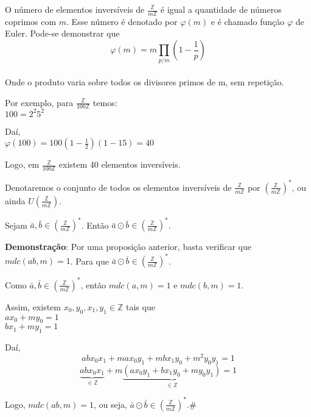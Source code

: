 O número de elementos inversíveis de $\displaystyle\frac{\mathbb{Z}}{m\mathbb{Z}}$ é igual a quantidade de números coprimos com $m$. Esse número é denotado por $\varphi(m)$ e é chamado função $\varphi$ de Euler. Pode-se demonstrar que
\[\varphi(m)=m\displaystyle\prod_{p/m}\left(1-\displaystyle\frac{1}{p}\right)\]\\
Onde o produto varia sobre todos os divisores primos de m, sem repetição.

Por exemplo, para $\displaystyle\frac{\mathbb{Z}}{100\mathbb{Z}}$ temos:\\
$100=2^{2}5^{2}$

Daí,\\
$\varphi(100)=100\left(1-\displaystyle\frac{1}{2}\right)(1-\displaystyle{1}{5})=40$

Logo, em $\displaystyle\frac{\mathbb{Z}}{100\mathbb{Z}}$ existem 40 elementos inversíveis.

\begin{nota} Denotaremos o conjunto de todos os elementos inversíveis de $\displaystyle\frac{\mathbb{Z}}{m\mathbb{Z}}$ por $\left(\displaystyle\frac{\mathbb{Z}}{m\mathbb{Z}}\right)^{*}$, ou ainda $U\left(\displaystyle\frac{\mathbb{Z}}{m\mathbb{Z}}\right)$.\end{nota}

\begin{proposicao} Sejam $\bar{a},\bar{b}\in\left(\displaystyle\frac{\mathbb{Z}}{m\mathbb{Z}}\right)^{*}$. Então $\bar{a}\odot\bar{b}\in\left(\displaystyle\frac{\mathbb{Z}}{m\mathbb{Z}}\right)^{*}$.\end{proposicao}

\textbf{Demonstração}: Por uma proposição anterior, basta verificar que\\ $mdc(ab,m)=1$. Para que $\bar{a}\odot\bar{b}\in\left(\displaystyle\frac{\mathbb{Z}}{m\mathbb{Z}}\right)^{*}$.

Como $\bar{a},\bar{b}\in\left(\displaystyle\frac{\mathbb{Z}}{m\mathbb{Z}}\right)^{*}$, então $mdc(a,m)=1$ e $mdc(b,m)=1$.

Assim, existem $x_{0},y_{0},x_{1},y_{1}\in\mathbb{Z}$ tais que\\
$ax_{0}+my_{0}=1$\\
$bx_{1}+my_{1}=1$

Daí,
\[abx_{0}x_{1}+max_{0}y_{1}+mbx_{1}y_{0}+m^{2}y_{0}y_{1}=1\]
\[\underbrace{abx_{0}x_{1}}_{\in\mathbb{Z}}+m\underbrace{(ax_{0}y_{1}+bx_{1}y_{0}+my_{0}y_{1})}_{\in\mathbb{Z}}=1\]

Logo, $mdc(ab,m)=1$, ou seja, $\bar{a}\odot\bar{b}\in\left(\displaystyle\frac{\mathbb{Z}}{m\mathbb{Z}}\right)^{*}$.\#